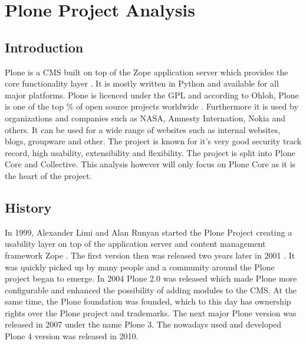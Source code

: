 \section{Plone Project Analysis} %
\label{sec:Plone Project Analysis}

\subsection{Introduction} %
\label{sub:Introduction}


Plone is a \ac{CMS} built on top of the Zope application server which provides
the core functionality layer \cite{Aspeli2005,PloneFaq,PloneWhatIsPlone}. It is
mostly written in Python and available for all major platforms. Plone is
licenced under the \ac{GPL} and according to Ohloh, Plone is one of the top
\unit[2]{\%} of open source projects worldwide \cite{PloneOhlohFactoids}.
Furthermore it is used by organizations and companies such as NASA, Amnesty
Internation, Nokia and others. It can be used for a wide range of websites such
as internal websites, blogs, groupware and other. The project is known for it's
very good security track record, high usability, extensibility and flexibility.
The project is split into Plone Core and Collective. This analysis however will
only focus on Plone Core as it is the heart of the project.


\subsection{History} %
\label{sub:History}

In 1999, Alexander Limi and Alan Runyan started the Plone Project creating a
usability layer on top of the application server and content management
framework Zope \cite{Aspeli2005,PloneFaq}. The first version then was released
two years later in 2001 \cite{PloneReleases}. It was quickly picked up by many
people and a community around the Plone project began to emerge. In 2004 Plone
2.0 was released which made Plone more configurable and enhanced the
possibility of adding modules to the \ac{CMS}. At the same time, the Plone
foundation was founded, which to this day has ownership rights over the Plone
project and trademarks. The next major Plone version was released in 2007 under
the name Plone 3. The nowadays used and developed Plone 4 version was released
in 2010.

